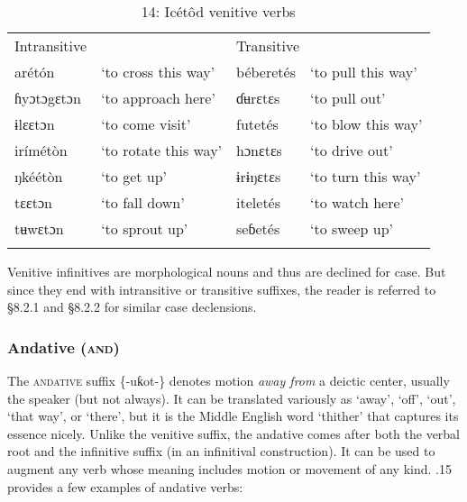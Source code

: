 \begin{table}
\caption{14: Icétôd venitive verbs}
\label{tab:8}


\begin{tabularx}{\textwidth}{XXXX}
\lsptoprule

Intransitive &  & \multicolumn{2}{X}{Transitive}\\
arétón & ‘to cross this way’ & béberetés & ‘to pull this way’\\
ɦyɔtɔgɛtɔn & ‘to approach here’ & ɗʉrɛtɛs & ‘to pull out’\\
ɨlɛɛtɔn & ‘to come visit’ & futetés & ‘to blow this way’\\
irímétòn & ‘to rotate this way’ & hɔnɛtɛs & ‘to drive out’\\
ŋkéétòn & ‘to get up’ & ɨrɨŋɛtɛs & ‘to turn this way’\\
tɛɛtɔn & ‘to fall down’ & iteletés & ‘to watch here’\\
tʉwɛtɔn & ‘to sprout up’ & seɓetés & ‘to sweep up’\\
\lspbottomrule
\end{tabularx}
\end{table}
Venitive infinitives are morphological nouns and thus are declined for case. But since they end with intransitive or transitive suffixes, the reader is referred to §8.2.1 and §8.2.2 for similar case declensions.


\subsubsection{Andative (\textsc{and})}

The \textsc{andative} suffix \{-uƙot-\} denotes motion \textit{away from} a deictic center, usually the speaker (but not always). It can be translated variously as ‘away’, ‘off’, ‘out’, ‘that way’, or ‘there’, but it is the Middle English word ‘thither’ that captures its essence nicely. Unlike the venitive suffix, the andative comes after both the verbal root and the infinitive suffix (in an infinitival construction). It can be used to augment any verb whose meaning includes motion or movement of any kind. .15 provides a few examples of andative verbs:


